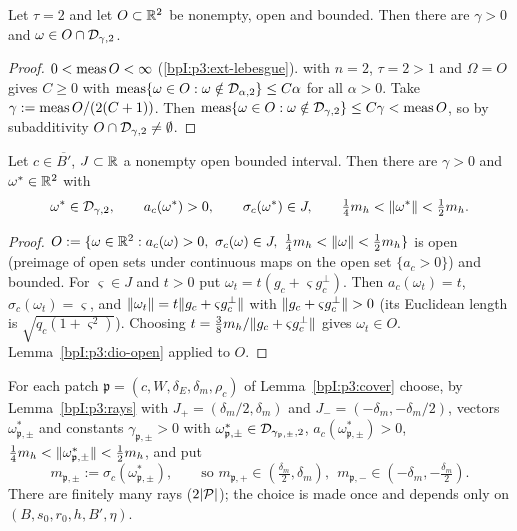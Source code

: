 \begin{lemma}\label{bpI:p3:dio-open}
Let $\tau=2$ and let $O\subset\mathbb{R}^2$ be nonempty, open and bounded. Then there are $\gamma>0$ and $\omega\in O\cap\mathcal{D}_{\gamma,2}$.
\end{lemma}
\begin{proof}
\label{stepI:p3:do-positive}
$0<\operatorname{meas} O<\infty$ (\ref{bpI:p3:ext-lebesgue}).  with $n=2$, $\tau=2>1$ and $\Omega=O$ gives $C\ge0$ with $\operatorname{meas}\{\omega\in O:\omega\notin\mathcal{D}_{\alpha,2}\}\le C\alpha$ for all $\alpha>0$.
\label{stepI:p3:do-choice}
Take $\gamma:=\operatorname{meas} O/(2(C+1))$. Then $\operatorname{meas}\{\omega\in O:\omega\notin\mathcal{D}_{\gamma,2}\}\le C\gamma<\operatorname{meas} O$, so by subadditivity $O\cap\mathcal{D}_{\gamma,2}\ne\emptyset$.
\end{proof}

\begin{lemma}\label{bpI:p3:rays}
Let $c\in\overline{B'}$, $J\subset\mathbb{R}$ a nonempty open bounded interval. Then there are $\gamma>0$ and $\omega^*\in\mathbb{R}^2$ with
\[
\omega^*\in\mathcal{D}_{\gamma,2},\qquad a_c(\omega^*)>0,\qquad\sigma_c(\omega^*)\in J,\qquad \tfrac14m_h<\lVert \omega^*\rVert<\tfrac12m_h .
\]
\end{lemma}
\begin{proof}
\label{stepI:p3:ry-open}
$O:=\{\omega\in\R^2:a_c(\omega)>0,\ \sigma_c(\omega)\in J,\ \tfrac14m_h<\norm\omega<\tfrac12m_h\}$ is open (preimage of open sets under continuous maps on the open set $\{a_c>0\}$) and bounded.
For $\varsigma\in J$ and $t>0$ put $\omega_t=t(g_c+\varsigma g_c^\perp)$. Then $a_c(\omega_t)=t$, $\sigma_c(\omega_t)=\varsigma$, and $\lVert \omega_t\rVert=t\lVert g_c+\varsigma g_c^\perp\rVert$ with $\lVert g_c+\varsigma g_c^\perp\rVert>0$
(its Euclidean length is $\sqrt{q_c(1+\varsigma^2)}$). Choosing $t=\tfrac38m_h/\lVert g_c+\varsigma g_c^\perp\rVert$ gives $\omega_t\in O$.
\label{stepI:p3:ry-dio}
Lemma~\ref{bpI:p3:dio-open} applied to $O$.
\end{proof}

\begin{definition}\label{bpI:p3:patch-rays}
For each patch $\mathfrak p=(c,W,\delta_E,\delta_m,\rho_c)$ of Lemma~\ref{bpI:p3:cover} choose, by Lemma~\ref{bpI:p3:rays} with $J_+=(\delta_m/2,\delta_m)$ and $J_-=(-\delta_m,-\delta_m/2)$,
vectors $\omega^*_{\mathfrak p,\pm}$ and constants $\gamma_{\mathfrak p,\pm}>0$ with
$\omega^*_{\mathfrak p,\pm}\in\mathcal{D}_{\gamma_{\mathfrak p,\pm},2}$, $a_c(\omega^*_{\mathfrak p,\pm})>0$, $\tfrac14m_h<\lVert \omega^*_{\mathfrak p,\pm}\rVert<\tfrac12m_h$, and put
\[
m_{\mathfrak p,\pm}:=\sigma_c(\omega^*_{\mathfrak p,\pm}),\qquad\text{so }m_{\mathfrak p,+}\in(\tfrac{\delta_m}2,\delta_m),\ \ m_{\mathfrak p,-}\in(-\delta_m,-\tfrac{\delta_m}2).
\]
There are finitely many rays ($2\lvert \mathcal P\rvert$); the choice is made once and depends only on $(B,s_0,r_0,h,B',\eta)$.
\end{definition}

